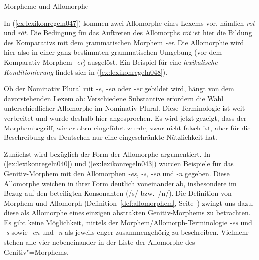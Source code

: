 \begin{Vertiefung}{Morpheme und Allomorphe}
\begin{exe}
  \ex \label{ex:lexikonregeln047}
  \begin{xlist}
  \end{xlist}
\end{exe}

In (\ref{ex:lexikonregeln047}) kommen zwei Allomorphe eines Lexems vor, nämlich \textit{rot} und \textit{röt}.
Die Bedingung für das Auftreten des Allomorphs \textit{röt} ist hier die Bildung des Komparativs mit dem grammatischen Morphem \textit{-er}.
Die Allomorphie wird hier also in einer ganz bestimmten grammatischen Umgebung (vor dem Komparativ-Morphem \textit{-er}) ausgelöst.
Ein Beispiel für eine \textit{lexikalische Konditionierung} findet sich in (\ref{ex:lexikonregeln048}).

\begin{exe}
  \ex \label{ex:lexikonregeln048}
  \begin{xlist}
  \end{xlist}
\end{exe}

Ob der Nominativ Plural mit \textit{-e}, \textit{-en} oder \textit{-er} gebildet wird, hängt von dem davorstehenden Lexem ab:
Verschiedene Substantive erfordern die Wahl unterschiedlicher Allomorphe im Nominativ Plural.
Diese Terminologie ist weit verbreitet und wurde deshalb hier angesprochen.
Es wird jetzt gezeigt, dass der Morphembegriff, wie er oben eingeführt wurde, zwar nicht falsch ist, aber für die Beschreibung des Deutschen nur eine eingeschränkte Nützlichkeit hat.

Zunächst wird bezüglich der Form der Allomorphe argumentiert.
In (\ref{ex:lexikonregeln040}) und (\ref{ex:lexikonregeln043}) wurden Beispiele für das Genitiv-Morphem mit den Allomorphen \textit{-es}, \textit{-s}, \textit{-en} und \textit{-n} gegeben.
Diese Allomorphe weichen in ihrer Form deutlich voneinander ab, insbesondere im Bezug auf den beteiligten Konsonanten (/s/ bzw.\ /n/).
Die Definition von Morphem und Allomorph (Definition~\ref{def:allomorphem}, Seite~\pageref{def:allomorphem}) zwingt uns dazu, diese als Allomorphe eines einzigen abstrakten Genitiv-Morphems zu betrachten.
Es gibt keine Möglichkeit, mittels der Morphem\slash Allomorph-Terminologie \textit{-es} und \textit{-s} sowie \textit{-en} und \textit{-n} als jeweils enger zusammengehörig zu beschreiben.
Vielmehr stehen alle vier nebeneinander in der Liste der Allomorphe des Genitiv"=Morphems.


\end{Vertiefung}
